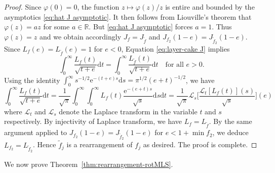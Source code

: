 \documentclass[11pt,letterpaper,oneside]{amsart}
\newcommand{\R}{\mathbb{R}}
\newcommand{\eu}{\mathrm{e}}
\theoremstyle{definition}
\theoremstyle{remark}
\newcommand{\wt}{\widetilde}
\theoremstyle{definition}
\theoremstyle{remark}
\newcommand{\dif}{\mathrm{d}}
\begin{document}
\begin{proof}
\medskip

	Since $\varphi(0) = 0$, the function $z \mapsto \varphi(z) /z$ is entire and bounded by the asymptotics \eqref{eq:hat J asymptotic}.
	It then follows from Liouville's theorem that $\varphi(z) = az$ for some $a \in \R$.
	But \eqref{eq:hat J asymptotic} forces $a = 1$. Thus $\varphi(z) = z$ and we obtain accordingly $J_f = J_{\wt f}$ and $J_{f_2}(1 - e) = J_{\wt f_2}(1 - e)$. Since $L_f(e) = L_{\wt f}(e) = 1$ for $e < 0$, Equation \eqref{eq:layer-cake J} implies 
	\begin{equation*}		\int_{0}^\infty \frac{L_f(t)}{\sqrt{t + e}} \dif t = \int_{0}^\infty \frac{L_{\wt f}(t)}{\sqrt{t + e}} \dif t \quad \text{for all $e > 0$}.
	\end{equation*}
	Using the identity $\int_0^\infty s^{-1/2}\eu^{-(t + e) s} \dif s = \pi^{1/2} (e + t)^{-1/2}$, we have 
	\begin{equation*}
		\int_{0}^\infty \frac{L_f(t)}{\sqrt{t + e}} \dif t = \frac{1}{\sqrt{\pi}} \int_{0}^\infty \int_0^\infty  L_f(t) \frac{\eu^{-(e + t)s}}{\sqrt{s}} \dif s \dif t = \frac{1}{\sqrt{\pi}} \mathscr{L}_s \bigg[  \frac{\mathscr{L}_t[L_f(t)](s)}{\sqrt{s}}\bigg](e)
	\end{equation*}
	where $\mathscr{L}_t$  and  $\mathscr{L}_s$  denote the Laplace transform in the variable $t$ and $s$ respectively.
	By injectivity of Laplace transform, we have $L_f = L_{\wt f}$.
	By the same argument applied to $J_{f_2}(1 - e) = J_{\wt f_2}(1 - e)$ for $e < 1 + \min f_2$, we deduce $L_{f_2} = L_{\wt f_2}$. 
	Hence $\wt f_j$ is a rearrangement of $f_j$ as desired. 
	The proof is complete.
\end{proof}

We now prove Theorem~\ref{thm:rearrangement-rotMLS}.
\end{document}
